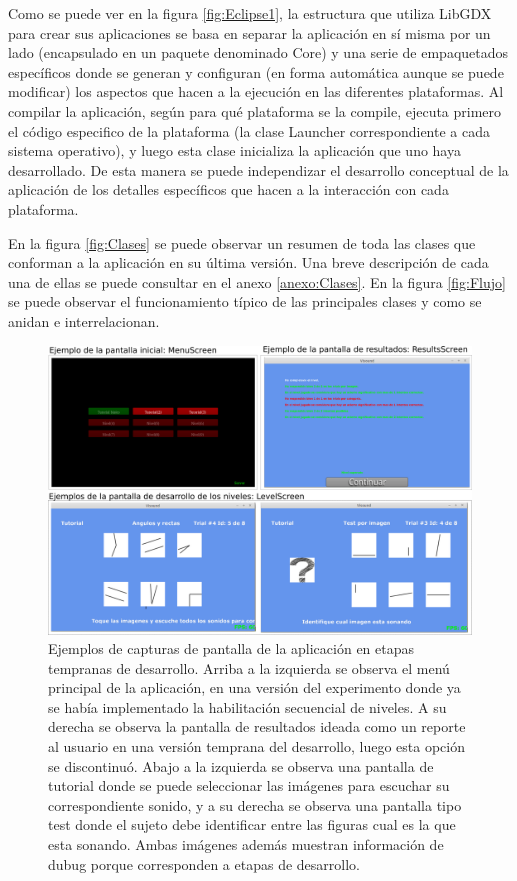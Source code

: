 \documentclass{article}
\numberwithin{figure}{section}
\begin{document}
    Como se puede ver en la figura \ref{fig:Eclipse1}, la estructura que utiliza LibGDX para crear sus aplicaciones se basa en separar la aplicación en sí misma por un lado (encapsulado en un paquete denominado Core) y una serie de empaquetados específicos donde se generan y configuran (en forma automática aunque se puede modificar) los aspectos que hacen a la ejecución en las diferentes plataformas. Al compilar la aplicación, según para qué plataforma se la compile, ejecuta primero el código especifico de la plataforma (la clase Launcher correspondiente a cada sistema operativo), y luego esta clase inicializa la aplicación que uno haya desarrollado. De esta manera se puede independizar el desarrollo conceptual de la aplicación de los detalles específicos que hacen a la interacción con cada plataforma. 
    
    En la figura \ref{fig:Clases} se puede observar un resumen de toda las clases que conforman a la aplicación en su última versión. Una breve descripción de cada una de ellas se puede consultar en el anexo \ref{anexo:Clases}. En la figura \ref{fig:Flujo} se puede observar el funcionamiento típico de las principales clases y como se anidan e interrelacionan. 
    
            
    \begin{figure}
        \center
        \includegraphics[width=\textwidth]{Imagenes/Pantallas1.png}
        \caption{Ejemplos de  capturas de pantalla de la aplicación en etapas tempranas de desarrollo. Arriba a la izquierda se observa el menú principal de la aplicación, en una versión del experimento donde ya se había implementado la habilitación secuencial de niveles. A su derecha se observa la pantalla de resultados ideada como un reporte al usuario en una versión temprana del desarrollo, luego esta opción se discontinuó. Abajo a la izquierda se observa una pantalla de tutorial donde se puede seleccionar las imágenes para escuchar su correspondiente sonido, y a su derecha se observa una pantalla tipo test donde el sujeto debe identificar entre las figuras cual es la que esta sonando. Ambas imágenes además muestran información de dubug porque corresponden a etapas de desarrollo. }
        \label{fig:Pantallas1}
    \end{figure}
    
\end{document}
